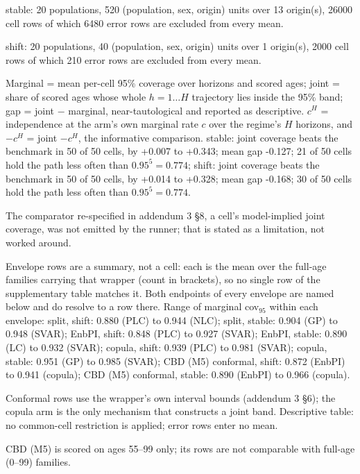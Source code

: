 \begin{table}[tbp]
\begin{threeparttable}
\begin{tabular}{@{}llrrrrrrrrrr@{}}
\bottomrule
\end{tabular}
\begin{tablenotes}\scriptsize
\item stable: 20 populations, 520 (population, sex, origin) units over 13 origin(s), 26000 cell rows of which 6480 error rows are excluded from every mean.
\item shift: 20 populations, 40 (population, sex, origin) units over 1 origin(s), 2000 cell rows of which 210 error rows are excluded from every mean.
\item Marginal = mean per-cell 95\% coverage over horizons and scored ages; joint = share of scored ages whose whole $h=1\ldots H$ trajectory lies inside the 95\% band; gap = joint $-$ marginal, near-tautological and reported as descriptive. $c^{H}$ = independence at the arm's own marginal rate $c$ over the regime's $H$ horizons, and $-c^{H}$ = joint $- c^{H}$, the informative comparison. stable: joint coverage beats the benchmark in 50 of 50 cells, by +0.007 to +0.343; mean gap -0.127; 21 of 50 cells hold the path less often than $0.95^{5} = 0.774$; shift: joint coverage beats the benchmark in 50 of 50 cells, by +0.014 to +0.328; mean gap -0.168; 30 of 50 cells hold the path less often than $0.95^{5} = 0.774$.
\item The comparator re-specified in addendum 3 \S8, a cell's model-implied joint coverage, was not emitted by the runner; that is stated as a limitation, not worked around.
\item Envelope rows are a summary, not a cell: each is the mean over the full-age families carrying that wrapper (count in brackets), so no single row of the supplementary table matches it. Both endpoints of every envelope are named below and do resolve to a row there. Range of marginal cov$_{95}$ within each envelope: split, shift: 0.880 (PLC) to 0.944 (NLC); split, stable: 0.904 (GP) to 0.948 (SVAR); EnbPI, shift: 0.848 (PLC) to 0.927 (SVAR); EnbPI, stable: 0.890 (LC) to 0.932 (SVAR); copula, shift: 0.939 (PLC) to 0.981 (SVAR); copula, stable: 0.951 (GP) to 0.985 (SVAR); CBD (M5) conformal, shift: 0.872 (EnbPI) to 0.941 (copula); CBD (M5) conformal, stable: 0.890 (EnbPI) to 0.966 (copula).
\item Conformal rows use the wrapper's own interval bounds (addendum 3 \S6); the copula arm is the only mechanism that constructs a joint band. Descriptive table: no common-cell restriction is applied; error rows enter no mean.
\item CBD (M5) is scored on ages 55--99 only; its rows are not comparable with full-age (0--99) families.

\end{tablenotes}
\end{threeparttable}
\end{table}
